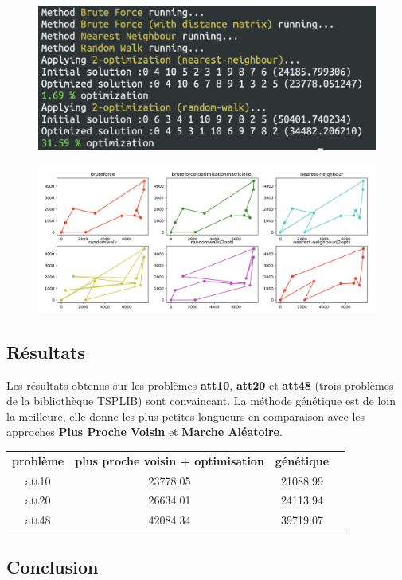 \documentclass[11pt]{article}
\begin{document}
\begin{figure}[H]
	\centering
		\includegraphics[scale=0.5]{capture_2} \\
\end{figure}
\begin{figure}[H]
	\centering
		\includegraphics[scale=0.25]{capture_3} \\
\end{figure}


\subsection*{Résultats}

Les résultats obtenus sur les problèmes \textbf{att10}, \textbf{att20} et \textbf{att48} (trois problèmes de la bibliothèque TSPLIB) sont convaincant. La méthode génétique est de loin la meilleure, elle donne les plus petites longueurs en comparaison avec les approches \textbf{Plus Proche Voisin} et \textbf{Marche Aléatoire}.\\

\begin{tabular}{ | c | c | c | c | }
	\textbf{problème} & \textbf{plus proche voisin + optimisation} & \textbf{génétique} \\
	att10	& 23778.05 & 21088.99 \\
	att20	& 26634.01 & 24113.94 \\
	att48	& 42084.34 & 39719.07 \\
\end{tabular}



\subsection*{Conclusion}
\end{document}
